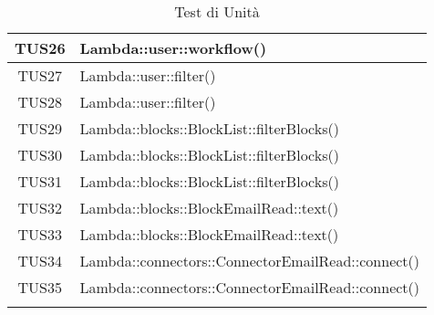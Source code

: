 \begin{longtable}{|c|m{24em}|}
TUS26 & Lambda::user::workflow()\\ \hline
TUS27 & Lambda::user::filter()\\ \hline
TUS28 & Lambda::user::filter()\\ \hline
TUS29 & Lambda::blocks::BlockList::filterBlocks()\\ \hline
TUS30 & Lambda::blocks::BlockList::filterBlocks()\\ \hline
TUS31 & Lambda::blocks::BlockList::filterBlocks()\\ \hline
TUS32 & Lambda::blocks::BlockEmailRead::text()\\ \hline
TUS33 & Lambda::blocks::BlockEmailRead::text()\\ \hline
TUS34 & Lambda::connectors::ConnectorEmailRead::connect()\\ \hline
TUS35 & Lambda::connectors::ConnectorEmailRead::connect()\\ \hline
\caption[Test di Unità]{Test di Unità}
\label{tabella:test2}
\end{longtable}
\clearpage

